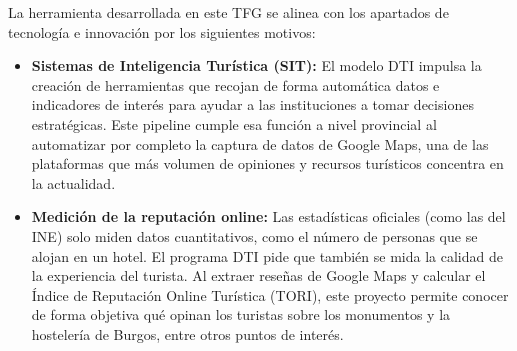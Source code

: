 La herramienta desarrollada en este TFG se alinea con los apartados de tecnología e innovación por los siguientes motivos:

\begin{itemize}
    \item \textbf{Sistemas de Inteligencia Turística (SIT):} El modelo DTI impulsa la creación de herramientas que recojan de forma automática datos e indicadores de interés para ayudar a las instituciones a tomar decisiones estratégicas. Este pipeline cumple esa función a nivel provincial al automatizar por completo la captura de datos de Google Maps, una de las plataformas que más volumen de opiniones y recursos turísticos concentra en la actualidad.
    
    \item \textbf{Medición de la reputación online:} Las estadísticas oficiales (como las del INE) solo miden datos cuantitativos, como el número de personas que se alojan en un hotel. El programa DTI pide que también se mida la calidad de la experiencia del turista. Al extraer reseñas de Google Maps y calcular el Índice de Reputación Online Turística (TORI), este proyecto permite conocer de forma objetiva qué opinan los turistas sobre los monumentos y la hostelería de Burgos, entre otros puntos de interés.
\end{itemize}